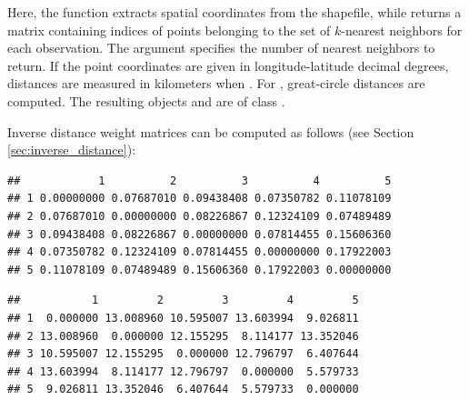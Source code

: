Here, the  function extracts spatial coordinates from the shapefile, while  returns a matrix containing indices of points belonging to the set of $k$-nearest neighbors for each observation. The  argument specifies the number of nearest neighbors to return. If the point coordinates are given in longitude-latitude decimal degrees, distances are measured in kilometers when . For , great-circle distances are computed. The resulting objects  and  are of class .

Inverse distance weight matrices can be computed as follows (see Section \ref{sec:inverse_distance}):

\begin{knitrout}
\color{fgcolor}\begin{kframe}
\begin{alltt}
 \hlkwb{<-} \hldef{(}  \hldef{=} \hldef{))}
\hldef{dist.mat[}\hlopt{:}\hldef{,} \hlopt{:}\hldef{]}
\end{alltt}
\begin{verbatim}
##            1          2          3          4          5
## 1 0.00000000 0.07687010 0.09438408 0.07350782 0.11078109
## 2 0.07687010 0.00000000 0.08226867 0.12324109 0.07489489
## 3 0.09438408 0.08226867 0.00000000 0.07814455 0.15606360
## 4 0.07350782 0.12324109 0.07814455 0.00000000 0.17922003
## 5 0.11078109 0.07489489 0.15606360 0.17922003 0.00000000
\end{verbatim}
\begin{alltt}
 \hlkwb{<-}  \hlopt{/}  
 \hlkwb{<-}       
\hldef{dist.mat.inv[}\hlopt{:}\hldef{,} \hlopt{:}\hldef{]}
\end{alltt}
\begin{verbatim}
##           1         2         3         4         5
## 1  0.000000 13.008960 10.595007 13.603994  9.026811
## 2 13.008960  0.000000 12.155295  8.114177 13.352046
## 3 10.595007 12.155295  0.000000 12.796797  6.407644
## 4 13.603994  8.114177 12.796797  0.000000  5.579733
## 5  9.026811 13.352046  6.407644  5.579733  0.000000
\end{verbatim}

\end{kframe}
\end{knitrout}
